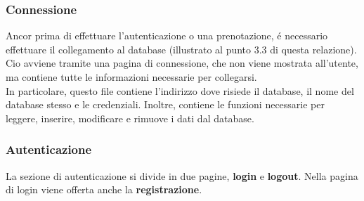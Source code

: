 \documentclass[]{article}
\begin{document}
\subsubsection{Connessione}
Ancor prima di effettuare l'autenticazione o una prenotazione, é necessario effettuare il collegamento al database (illustrato al punto 3.3 di questa relazione).\\
Cio avviene tramite una pagina di connessione, che non viene mostrata all'utente, ma contiene tutte le informazioni necessarie per collegarsi.\\
In particolare, questo file contiene l'indirizzo dove risiede il database, il nome del database stesso e le credenziali. Inoltre, contiene le funzioni necessarie per leggere, inserire, modificare e rimuove i dati dal database.
\subsubsection{Autenticazione}
La sezione di autenticazione si divide in due pagine, \textbf{login} e \textbf{logout}. Nella pagina di login viene offerta anche la \textbf{registrazione}.
\end{document}
